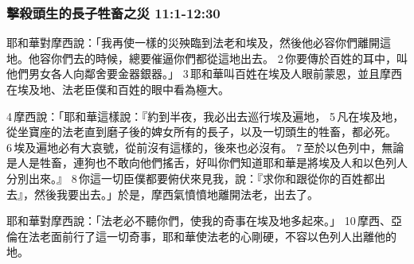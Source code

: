\subsubsection{擊殺頭生的長子牲畜之災 11:1-12:30}
耶和華對摩西說：「我再使一樣的災殃臨到法老和埃及，然後他必容你們離開這地。他容你們去的時候，總要催逼你們都從這地出去。 2 你要傳於百姓的耳中，叫他們男女各人向鄰舍要金器銀器。」 3 耶和華叫百姓在埃及人眼前蒙恩，並且摩西在埃及地、法老臣僕和百姓的眼中看為極大。

4 摩西說：「耶和華這樣說：『約到半夜，我必出去巡行埃及遍地， 5 凡在埃及地，從坐寶座的法老直到磨子後的婢女所有的長子，以及一切頭生的牲畜，都必死。 6 埃及遍地必有大哀號，從前沒有這樣的，後來也必沒有。 7 至於以色列中，無論是人是牲畜，連狗也不敢向他們搖舌，好叫你們知道耶和華是將埃及人和以色列人分別出來。』 8 你這一切臣僕都要俯伏來見我，說：『求你和跟從你的百姓都出去』，然後我要出去。」於是，摩西氣憤憤地離開法老，出去了。

耶和華對摩西說：「法老必不聽你們，使我的奇事在埃及地多起來。」 10 摩西、亞倫在法老面前行了這一切奇事，耶和華使法老的心剛硬，不容以色列人出離他的地。

